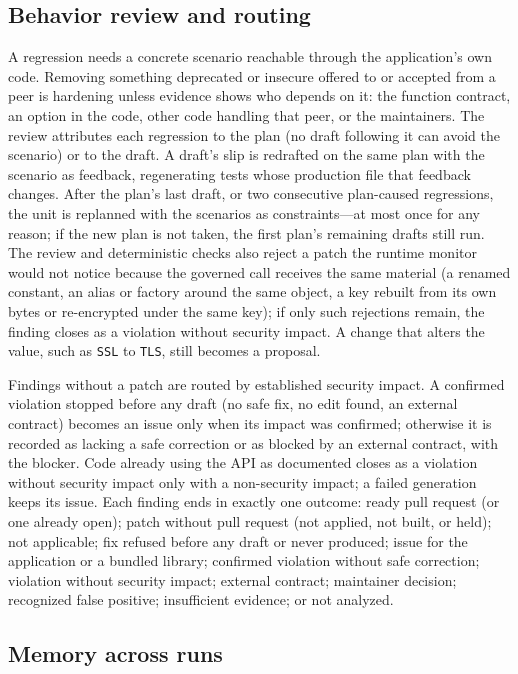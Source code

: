 \documentclass[conference]{IEEEtran}
\begin{document}
\subsection{Behavior review and routing}

A regression needs a concrete scenario reachable through the application's own
code. Removing something deprecated or insecure offered to or accepted from a
peer is hardening unless evidence shows who depends on it: the function
contract, an option in the code, other code handling that peer, or the
maintainers. The review attributes each regression to the plan (no draft
following it can avoid the scenario) or to the draft. A draft's slip is
redrafted on the same plan with the scenario as feedback, regenerating tests
whose production file that feedback changes. After the plan's last draft, or
two consecutive plan-caused regressions, the unit is replanned with the
scenarios as constraints---at most once for any reason; if the new plan is not
taken, the first plan's remaining drafts still run. The review and
deterministic checks also reject a patch the runtime monitor would not notice
because the governed call receives the same material (a renamed constant, an
alias or factory around the same object, a key rebuilt from its own bytes or
re-encrypted under the same key); if only such rejections remain, the finding
closes as a violation without security impact. A change that alters the value,
such as \texttt{SSL} to \texttt{TLS}, still becomes a proposal.

Findings without a patch are routed by established security impact. A
confirmed violation stopped before any draft (no safe fix, no edit found, an
external contract) becomes an issue only when its impact was confirmed;
otherwise it is recorded as lacking a safe correction or as blocked by an
external contract, with the blocker. Code already using the API as documented
closes as a violation without security impact only with a non-security impact;
a failed generation keeps its issue. Each finding ends in exactly one outcome:
ready pull request (or one already open); patch without pull request (not
applied, not built, or held); not applicable; fix refused before any draft or
never produced; issue for the application or a bundled library; confirmed
violation without safe correction; violation without security impact; external
contract; maintainer decision; recognized false positive; insufficient
evidence; or not analyzed.

\subsection{Memory across runs}
\end{document}
